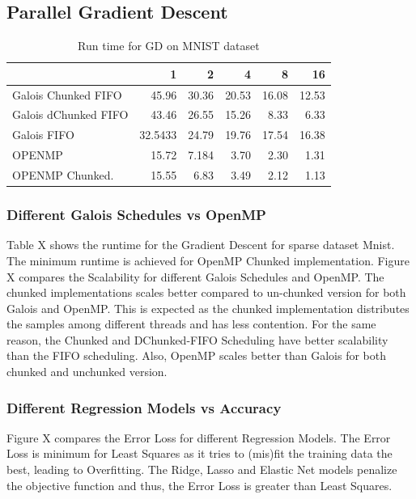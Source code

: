 \documentclass{sigplanconf}
\begin{document}
\subsection{Parallel Gradient Descent}	
\begin{table}[htbp]
\caption{Run time for GD on MNIST dataset}
\begin{tabular}{|l|r|r|r|r|r|}
\hline
 & 1 & 2 & 4 & 8 & 16 \\ \hline
Galois Chunked FIFO & 45.96 & 30.36 & 20.53 & 16.08 & 12.53 \\ \hline
Galois dChunked FIFO & 43.46 & 26.55 & 15.26 & 8.33 & 6.33 \\ \hline
Galois FIFO & 32.5433 & 24.79 & 19.76 & 17.54 & 16.38 \\ \hline
OPENMP & 15.72 & 7.184 & 3.70 & 2.30 & 1.31 \\ \hline
OPENMP Chunked. & 15.55 & 6.83 & 3.49 & 2.12 & 1.13 \\ \hline
\end{tabular}
\end{table}
	
	\subsubsection{Different Galois Schedules vs OpenMP}
	Table X shows the runtime for the Gradient Descent for sparse dataset Mnist. The minimum runtime is 
	achieved for OpenMP Chunked implementation. Figure X compares the Scalability for different Galois Schedules and OpenMP.
	The chunked implementations scales better compared to un-chunked version for both Galois and OpenMP. This is expected as the chunked
    	implementation distributes the samples among different threads and has less contention. For the same reason,
    	the Chunked and DChunked-FIFO Scheduling have better scalability than the FIFO scheduling. Also, OpenMP
    	scales better than Galois for both chunked and unchunked version.
     
    	\subsubsection{Different Regression Models vs Accuracy}
	Figure X compares the Error Loss for different Regression Models. The Error Loss is minimum for Least Squares
	as it tries to (mis)fit the training data the best, leading to Overfitting. The Ridge, Lasso and Elastic Net
	models penalize the objective function and thus, the Error Loss is greater than Least Squares. 
    
\end{document}
